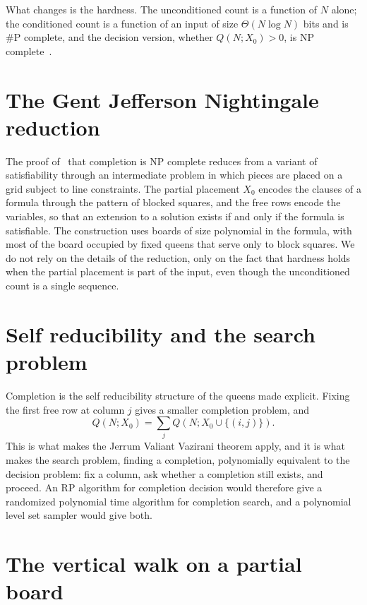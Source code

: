 \documentclass[11pt,twoside,openany]{book}
\theoremstyle{plain}
\theoremstyle{definition}
\theoremstyle{remark}
\newcommand{\RP}{\mathrm{RP}}
\newcommand{\NP}{\mathrm{NP}}
\newcommand{\sharpP}{\#\mathrm{P}}
\begin{document}
What changes is the hardness. The unconditioned count is a function of $N$ alone; the conditioned count is a function of an input of size $\Theta(N \log N)$ bits and is $\sharpP$ complete, and the decision version, whether $Q(N; X_0) > 0$, is $\NP$ complete~\cite{GJN}.

\section{The Gent Jefferson Nightingale reduction}

The proof of~\cite{GJN} that completion is $\NP$ complete reduces from a variant of satisfiability through an intermediate problem in which pieces are placed on a grid subject to line constraints. The partial placement $X_0$ encodes the clauses of a formula through the pattern of blocked squares, and the free rows encode the variables, so that an extension to a solution exists if and only if the formula is satisfiable. The construction uses boards of size polynomial in the formula, with most of the board occupied by fixed queens that serve only to block squares. We do not rely on the details of the reduction, only on the fact that hardness holds when the partial placement is part of the input, even though the unconditioned count is a single sequence.

\section{Self reducibility and the search problem}

Completion is the self reducibility structure of the queens made explicit. Fixing the first free row at column $j$ gives a smaller completion problem, and
\[
Q(N; X_0) = \sum_{j} Q(N; X_0 \cup \{(i, j)\}) .
\]
This is what makes the Jerrum Valiant Vazirani theorem apply, and it is what makes the search problem, finding a completion, polynomially equivalent to the decision problem: fix a column, ask whether a completion still exists, and proceed. An $\RP$ algorithm for completion decision would therefore give a randomized polynomial time algorithm for completion search, and a polynomial level set sampler would give both.

\section{The vertical walk on a partial board}
\end{document}
